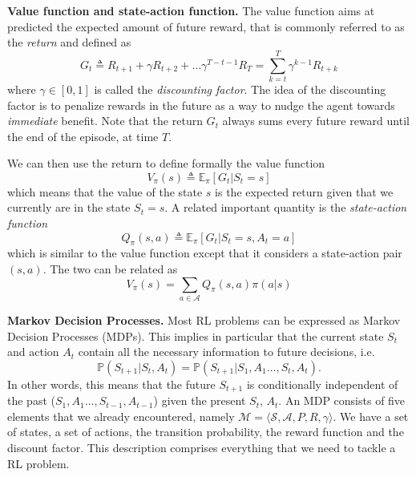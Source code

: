 \textbf{Value function and state-action function.} The value function aims at predicted the expected amount of future reward, that is commonly referred to as the \textit{return} and defined as 
$$G_t \triangleq R_{t+1} + \gamma R_{t+2} + \ldots \gamma^{T-t-1} R_T = \sum_{k=t}^T \gamma^{k-1} R_{t+k}$$
where $\gamma \in [0,1]$ is called the \textit{discounting factor}.  The idea of the discounting factor is to penalize rewards in the future as a way to nudge the agent towards \textit{immediate} benefit. Note that the return $G_t$ always sums every future reward until the end of the episode, at time $T$.

We can then use the return to define formally the value function
\begin{equation}
V_\pi(s) \triangleq \mathbb{E}_\pi[G_t|S_t =s]\label{eq:v_def}
\end{equation}
which means that the value of the state $s$ is the expected return given that we currently are in the state $S_t=s$. A related important quantity is the \textit{state-action function} 
\begin{equation}
    Q_\pi(s,a) \triangleq \mathbb{E}_\pi [G_t|S_t=s, A_t=a]  \label{eq:q_def}
\end{equation}
which is similar to the value function except that it considers a state-action pair $(s,a)$. The two can be related as
\begin{equation}
    V_\pi(s) = \sum_{a\in \mathcal{A}} Q_\pi(s,a)\pi(a|s)\label{eq:value_to_q}    
\end{equation}



\textbf{Markov Decision Processes.} Most RL problems can be expressed as Markov Decision Processes (MDPs). This implies in particular that the current state $S_t$ and action $A_t$ contain all the necessary information to future decisions, i.e.
$$\mathbb{P}(S_{t+1}|S_t,A_t) = \mathbb{P}(S_{t+1}|S_1, A_1 \ldots, S_t, A_t).$$
In other words, this means that the future $S_{t+1}$ is conditionally independent of the past ($S_1,A_1\ldots, S_{t-1},A_{t-1}$) given the present $S_t$, $A_t$. An MDP consists of five elements that we already encountered, namely $\mathcal{M} = \langle \mathcal{S}, \mathcal{A}, P, R, \gamma \rangle$. We have a set of states, a set of actions, the transition probability, the reward function and the discount factor. This description comprises everything that we need to tackle a RL problem.

